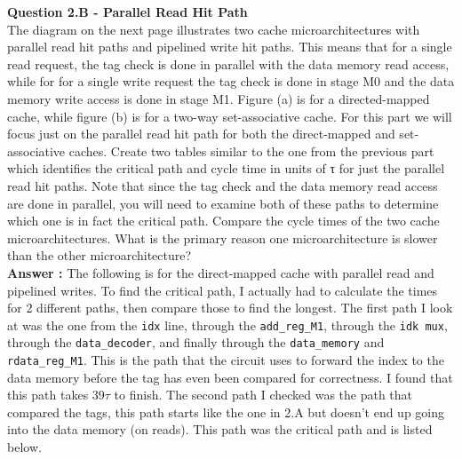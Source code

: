 \documentclass[a4paper,11pt]{article}
\newcommand{\answer}{\textbf{Answer : }}
\newcommand{\T}{\texttt}
\newcommand{\V}{\verb}
\begin{document}
\item \textbf{Question 2.B - Parallel Read Hit Path} \\ 

The diagram on the next page illustrates two cache microarchitectures with parallel read hit paths and pipelined write hit paths. This means that for a single read request, the tag check is done in parallel with the data memory read access, while for for a single write request the tag check is done in stage M0 and the data memory write access is done in stage M1. Figure (a) is for a directed-mapped cache, while figure (b) is for a two-way set-associative cache. For this part we will focus just on the parallel read hit path for both the direct-mapped and set-associative caches. Create two tables similar to the one from the previous part which identifies the critical path and cycle time in units of τ for just the parallel read hit paths. Note that since the tag check and the data memory read access are done in parallel, you will need to examine both of these paths to determine which one is in fact the critical path. Compare the cycle times of the two cache microarchitectures. What is the primary reason one microarchitecture is slower than the other microarchitecture? \\

\answer The following is for the direct-mapped cache with parallel read and pipelined writes. To find the critical path, I actually had to calculate the times for 2 different paths, then compare those to find the longest. The first path I look at was the one from the \T{idx} line, through the \V.add_reg_M1., through the \V.idk mux., through the \V.data_decoder., and finally through the \V.data_memory. and \V.rdata_reg_M1.. This is the path that the circuit uses to forward the index to the data memory before the tag has even been compared for correctness. I found that this path takes $39\tau$ to finish. The second path I checked was the path that compared the tags, this path starts like the one in 2.A but doesn't end up going into the data memory (on reads). This path was the critical path and is listed below.
\end{document}
